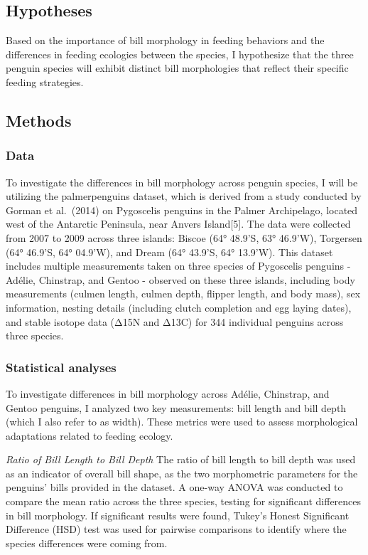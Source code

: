 \documentclass[
]{article}
\begin{document}
\subsection{Hypotheses}\label{hypotheses}

Based on the importance of bill morphology in feeding behaviors and the
differences in feeding ecologies between the species, I hypothesize that
the three penguin species will exhibit distinct bill morphologies that
reflect their specific feeding strategies.

\subsection{Methods}\label{methods}

\subsubsection{Data}\label{data}

To investigate the differences in bill morphology across penguin
species, I will be utilizing the palmerpenguins dataset, which is
derived from a study conducted by Gorman et al.~(2014) on Pygoscelis
penguins in the Palmer Archipelago, located west of the Antarctic
Peninsula, near Anvers Island{[}5{]}. The data were collected from 2007
to 2009 across three islands: Biscoe (64° 48.9'S, 63° 46.9'W), Torgersen
(64° 46.9'S, 64° 04.9'W), and Dream (64° 43.9'S, 64° 13.9'W). This
dataset includes multiple measurements taken on three species of
Pygoscelis penguins - Adélie, Chinstrap, and Gentoo - observed on these
three islands, including body measurements (culmen length, culmen depth,
flipper length, and body mass), sex information, nesting details
(including clutch completion and egg laying dates), and stable isotope
data (Δ15N and Δ13C) for 344 individual penguins across three species.

\subsubsection{Statistical analyses}\label{statistical-analyses}

To investigate differences in bill morphology across Adélie, Chinstrap,
and Gentoo penguins, I analyzed two key measurements: bill length and
bill depth (which I also refer to as width). These metrics were used to
assess morphological adaptations related to feeding ecology.

\emph{Ratio of Bill Length to Bill Depth} The ratio of bill length to
bill depth was used as an indicator of overall bill shape, as the two
morphometric parameters for the penguins' bills provided in the dataset.
A one-way ANOVA was conducted to compare the mean ratio across the three
species, testing for significant differences in bill morphology. If
significant results were found, Tukey's Honest Significant Difference
(HSD) test was used for pairwise comparisons to identify where the
species differences were coming from.
\end{document}
